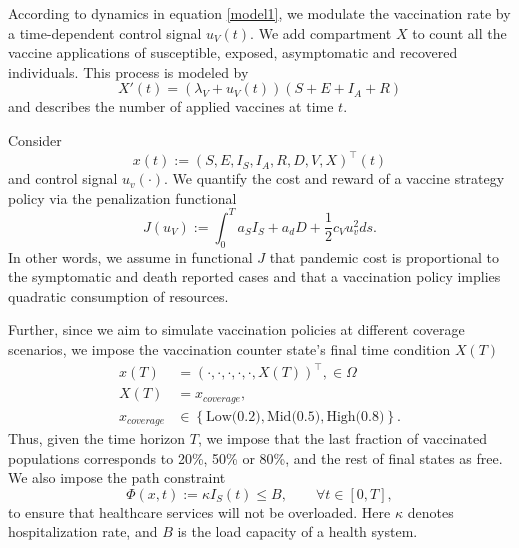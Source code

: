   According to dynamics in equation \eqref{model1}, we modulate the vaccination rate by 
a time-dependent control signal  $u_V(t)$. We add  compartment $X$ to count all the vaccine
applications of susceptible, exposed, asymptomatic and
recovered individuals. This process is modeled by
\begin{equation}
    \label{eqn:counter}
      X'(t) =
        (\lambda_V + u_V(t))(S + E + I_A + R)
\end{equation}
and describes the number of applied vaccines at time $t$.
 
Consider
  {$${x(t):= (S,E,I_S,I_A,R,D,V,X)^{\top}(t)}$$} and control signal
  $u_v(\cdot)$. We quantify the cost and reward of a vaccine strategy 
  policy via the penalization functional
  \begin{equation}
    \label{eqn:cost_functional}
    J(u_V):=
      \int _0 ^ T
      a_S I_S + a_d D +
      \frac{1}{2}
        c_V u_v^2
      ds.
  \end{equation}
  In other words, we assume in functional $J$ that pandemic cost is proportional to the
  symptomatic and death reported cases and that a vaccination policy
  implies quadratic consumption of resources.

  Further, since we aim to simulate vaccination policies at different coverage
  scenarios, we impose the vaccination counter state's final
  time condition $X(T)$
  \begin{equation}
    \begin{aligned}
      x(T) &= (\cdot, \cdot, \cdot, \cdot, \cdot, X(T))^{\top},
      \in \Omega
      \\
      X(T)
        &= x_{cover age},
      \\
      x_{coverage}
        & \in
        \left \{
          \text{Low(0.2)},\text{Mid(0.5)}, \text{High(0.8)}
        \right \} .
    \end{aligned}
  \end{equation}
  Thus, given the time horizon $T$, we impose that the last fraction of
  vaccinated populations corresponds to 20\%, 50\% or 80\%, and
  the rest of final states as free. We also impose the path constraint
  \begin{equation}
    \label{eqn:path_constrain}
    \Phi(x,t):= \kappa I_S(t) \leq B,
    \qquad \forall t \in [0, T],
  \end{equation}
  to ensure that healthcare services will not be overloaded. Here $\kappa$
  denotes hospitalization rate, and $B$ is the load capacity of a
  health system.

